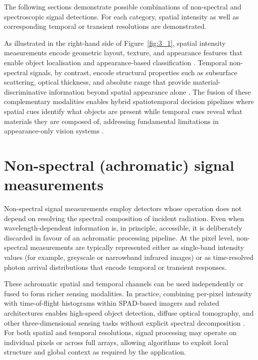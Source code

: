 \documentclass[12pt,a4paper,oneside]{report}
\let\oldsection\section
\renewcommand{\section}{\clearpage\oldsection}
\begin{document}
The following sections demonstrate possible combinations of non-spectral and spectroscopic signal detections. For each category, spatial intensity as well as corresponding temporal or transient resolutions are demonstrated.

As illustrated in the right-hand side of Figure~\ref{fig:3_1}, spatial intensity measurements encode geometric layout, texture, and appearance features that enable object localisation and appearance-based classification \cite{schwartz2013,sharan2013}. Temporal non-spectral signals, by contrast, encode structural properties such as subsurface scattering, optical thickness, and absolute range that provide material-discriminative information beyond spatial appearance alone \cite{su2016,becker2023}. The fusion of these complementary modalities enables hybrid spatiotemporal decision pipelines where spatial cues identify what objects are present while temporal cues reveal what materials they are composed of, addressing fundamental limitations in appearance-only vision systems \cite{yang2024,moramartin2021}.

\section{Non-spectral (achromatic) signal measurements}
\label{sec:non_spectral_achromatic_measurements}

Non-spectral signal measurements employ detectors whose operation does not depend on resolving the spectral composition of incident radiation. Even when wavelength-dependent information is, in principle, accessible, it is deliberately discarded in favour of an achromatic processing pipeline. At the pixel level, non-spectral measurements are typically represented either as single-band intensity values (for example, greyscale or narrowband infrared images) or as time-resolved photon arrival distributions that encode temporal or transient responses.

These achromatic spatial and temporal channels can be used independently or fused to form richer sensing modalities. In practice, combining per-pixel intensity with time-of-flight histograms within SPAD-based imagers and related architectures enables high-speed object detection, diffuse optical tomography, and other three-dimensional sensing tasks without explicit spectral decomposition \cite{moramartin2021,lyons2019}. For both spatial and temporal resolutions, signal processing may operate on individual pixels or across full arrays, allowing algorithms to exploit local structure and global context as required by the application.
\end{document}
